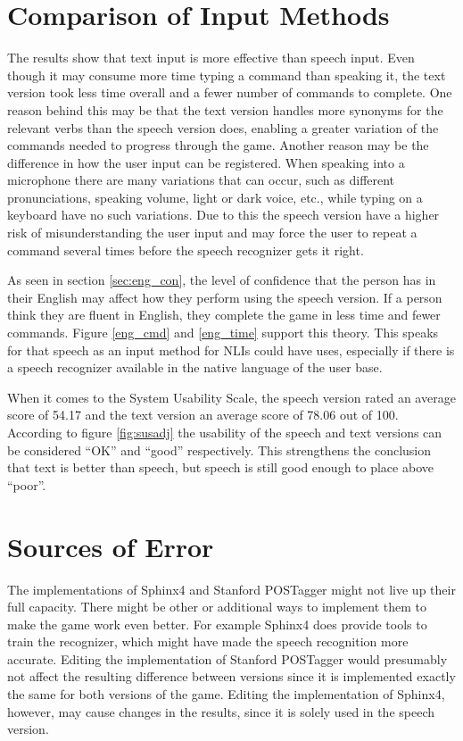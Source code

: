 \section{Comparison of Input Methods} %
The results show that text input is more effective than speech input. Even though it may consume more time typing a command than speaking it, the text version took less time overall and a fewer number of commands to complete. One reason behind this may be that the text version handles more synonyms for the relevant verbs than the speech version does, enabling a greater variation of the commands needed to progress through the game. Another reason may be the difference in how the user input can be registered. When speaking into a microphone there are many variations that can occur, such as different pronunciations, speaking volume, light or dark voice, etc., while typing on a keyboard have no such variations. Due to this the speech version have a higher risk of misunderstanding the user input and may force the user to repeat a command several times before the speech recognizer gets it right. 

As seen in section \ref{sec:eng_con}, the level of confidence that the person has in their English may affect how they perform using the speech version. If a person think they are fluent in English, they complete the game in less time and fewer commands. Figure \ref{eng_cmd} and \ref{eng_time} support this theory. This speaks for that speech as an input method for NLIs could have uses, especially if there is a speech recognizer available in the native language of the user base.

When it comes to the System Usability Scale, the speech version rated an average score of 54.17 and the text version an average score of 78.06 out of 100. According to figure \ref{fig:susadj} the usability of the speech and text versions can be considered ``OK'' and ``good'' respectively. This strengthens the conclusion that text is better than speech, but speech is still good enough to place above ``poor''.

\section{Sources of Error} %
The implementations of Sphinx4 and Stanford POSTagger might not live up their full capacity. There might be other or additional ways to implement them to make the game work even better. For example Sphinx4 does provide tools to train the recognizer, which might have made the speech recognition more accurate. Editing the implementation of Stanford POSTagger would presumably not affect the resulting difference between versions since it is implemented exactly the same for both versions of the game. Editing the implementation of Sphinx4, however, may cause changes in the results, since it is solely used in the speech version.

